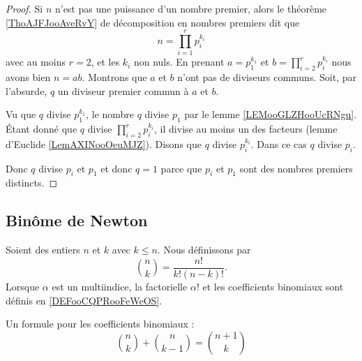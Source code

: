 \begin{proof}
	Si \( n\) n'est pas une puissance d'un nombre premier, alors le théorème \ref{ThoAJFJooAveRvY} de décomposition en nombres premiers dit que
	\begin{equation}
		n=\prod_{i=1}^rp_i^{k_i}
	\end{equation}
	avec au moins \( r=2\), et les \( k_i\) non nuls. En prenant \( a=p_1^{k_1}\) et \( b=\prod_{i=2}^rp_i^{k_i}\) nous avons bien \( n=ab\). Montrons que \( a\) et \( b\) n'ont pas de diviseurs communs. Soit, par l'absurde, \( q\) un diviseur premier commun à \( a\) et \( b\).

	Vu que \( q\) divise \( p_1^{k_1}\), le nombre \( q\) divise \( p_1\) par le lemme \ref{LEMooGLZHooUcRNgu}. Étant donné que \( q\) divise \( \prod_{i=2}^rp_i^{k_i}\), il divise au moins un des facteurs (lemme d'Euclide \ref{LemAXINooOeuMJZ}). Disons que \( q\) divise \( p_i^{k_i}\). Dans ce cas \( q\) divise \( p_i\).

	Donc \( q\) divise \( p_i\) et \( p_1\) et donc \( q=1\) parce que \( p_i\) et \( p_1\) sont des nombres premiers distincts.
\end{proof}


\subsection{Binôme de Newton}


\begin{definition}		\label{DEFooHXNFooOBKgqD}
	Soient des entiers \( n\) et \( k\) avec \( k\leq n\). Nous définissons  par
	\begin{equation}		\label{EQooJJYGooTvmSAt}
		{n\choose k} = \frac{ n! }{ k!(n-k)! }.
	\end{equation}
	Lorsque \( \alpha\) est un multiindice, la factorielle \( \alpha!\) et les coefficients binomiaux sont définis en \ref{DEFooCQPRooFeWeOS}.
\end{definition}

\begin{lemma}		\label{LEMooHWMNooIINsxu}
	Un formule pour les coefficients binomiaux :
	\begin{equation}
		{n\choose k}+{n\choose k-1}={n+1\choose k}
	\end{equation}
\end{lemma}

